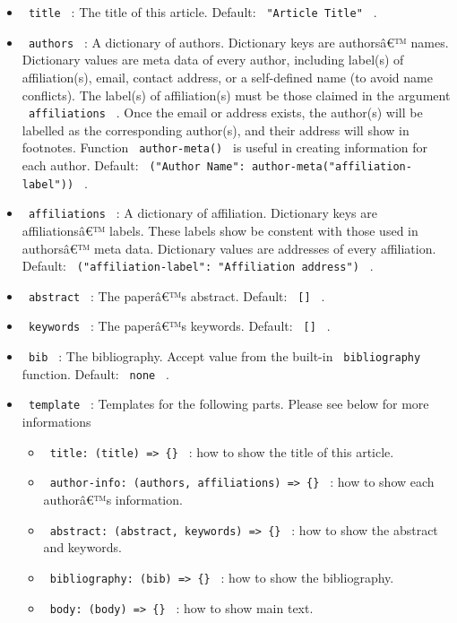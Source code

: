 \begin{itemize}
\tightlist
\item
  \texttt{\ title\ } : The title of this article. Default:
  \texttt{\ "Article\ Title"\ } .
\item
  \texttt{\ authors\ } : A dictionary of authors. Dictionary keys are
  authorsâ€™ names. Dictionary values are meta data of every author,
  including label(s) of affiliation(s), email, contact address, or a
  self-defined name (to avoid name conflicts). The label(s) of
  affiliation(s) must be those claimed in the argument
  \texttt{\ affiliations\ } . Once the email or address exists, the
  author(s) will be labelled as the corresponding author(s), and their
  address will show in footnotes. Function \texttt{\ author-meta()\ } is
  useful in creating information for each author. Default:
  \texttt{\ ("Author\ Name":\ author-meta("affiliation-label"))\ } .
\item
  \texttt{\ affiliations\ } : A dictionary of affiliation. Dictionary
  keys are affiliationsâ€™ labels. These labels show be constent with
  those used in authorsâ€™ meta data. Dictionary values are addresses of
  every affiliation. Default:
  \texttt{\ ("affiliation-label":\ "Affiliation\ address")\ } .
\item
  \texttt{\ abstract\ } : The paperâ€™s abstract. Default:
  \texttt{\ {[}{]}\ } .
\item
  \texttt{\ keywords\ } : The paperâ€™s keywords. Default:
  \texttt{\ {[}{]}\ } .
\item
  \texttt{\ bib\ } : The bibliography. Accept value from the built-in
  \texttt{\ bibliography\ } function. Default: \texttt{\ none\ } .
\item
  \texttt{\ template\ } : Templates for the following parts. Please see
  below for more informations

  \begin{itemize}
  \tightlist
  \item
    \texttt{\ title:\ (title)\ =\textgreater{}\ \{\}\ } : how to show
    the title of this article.
  \item
    \texttt{\ author-info:\ (authors,\ affiliations)\ =\textgreater{}\ \{\}\ }
    : how to show each authorâ€™s information.
  \item
    \texttt{\ abstract:\ (abstract,\ keywords)\ =\textgreater{}\ \{\}\ }
    : how to show the abstract and keywords.
  \item
    \texttt{\ bibliography:\ (bib)\ =\textgreater{}\ \{\}\ } : how to
    show the bibliography.
  \item
    \texttt{\ body:\ (body)\ =\textgreater{}\ \{\}\ } : how to show main
    text.
  \end{itemize}
\end{itemize}

